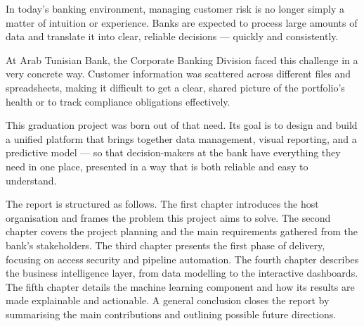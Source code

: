 
%
%

In today's banking environment, managing customer risk is no longer simply a matter
of intuition or experience. Banks are expected to process large amounts of data and
translate it into clear, reliable decisions --- quickly and consistently.

At Arab Tunisian Bank, the Corporate Banking Division faced this challenge in a very
concrete way. Customer information was scattered across different files and spreadsheets,
making it difficult to get a clear, shared picture of the portfolio's health or to track
compliance obligations effectively.

This graduation project was born out of that need. Its goal is to design and build a
unified platform that brings together data management, visual reporting, and a predictive
model --- so that decision-makers at the bank have everything they need in one place,
presented in a way that is both reliable and easy to understand.

The report is structured as follows. The first chapter introduces the host organisation
and frames the problem this project aims to solve. The second chapter covers the project
planning and the main requirements gathered from the bank's stakeholders. The third chapter
presents the first phase of delivery, focusing on access security and pipeline automation.
The fourth chapter describes the business intelligence layer, from data modelling to the
interactive dashboards. The fifth chapter details the machine learning component and how
its results are made explainable and actionable. A general conclusion closes the report
by summarising the main contributions and outlining possible future directions.
